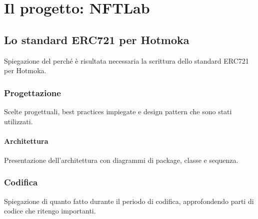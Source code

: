 
\chapter{Il progetto: NFTLab}
\label{cap:nftlab}

















\section{Lo standard ERC721 per Hotmoka}
Spiegazione del perché è risultata necessaria la scrittura dello standard ERC721 per Hotmoka.

\subsection{Progettazione}
Scelte progettuali, best practices impiegate e design pattern che sono stati utilizzati. 

\subsubsection{Architettura}
Presentazione dell'architettura con diagrammi di package, classe e sequenza.

\subsection{Codifica}
Spiegazione di quanto fatto durante il periodo di codifica, approfondendo parti di codice che ritengo importanti.


